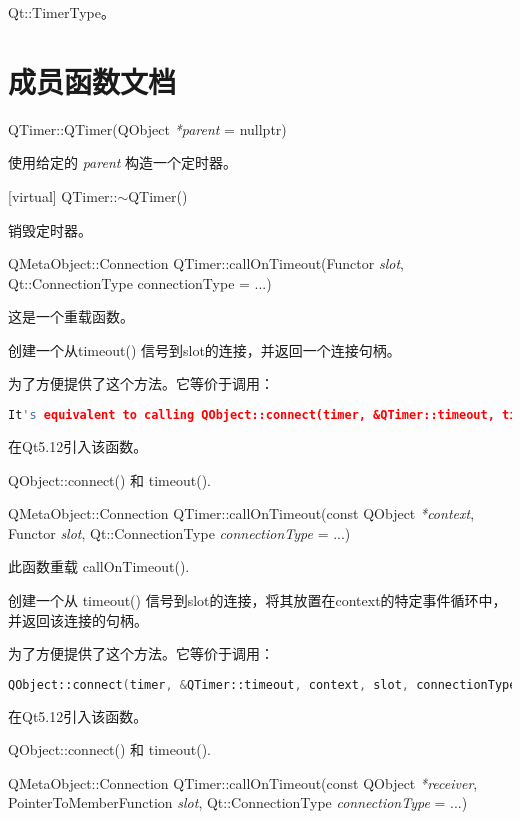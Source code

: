 \begin{seeAlso}
Qt::TimerType。
\end{seeAlso}

\section{成员函数文档}

QTimer::QTimer(QObject \emph{*parent} = nullptr)

使用给定的 \emph{parent} 构造一个定时器。

[virtual] QTimer::$\sim$QTimer()

销毁定时器。

QMetaObject::Connection QTimer::callOnTimeout(Functor \emph{slot}, Qt::ConnectionType connectionType = ...)

这是一个重载函数。

创建一个从timeout() 信号到slot的连接，并返回一个连接句柄。

为了方便提供了这个方法。它等价于调用：

\begin{lstlisting}[language=C++]
It's equivalent to calling QObject::connect(timer, &QTimer::timeout, timer, slot, connectionType).
\end{lstlisting}

在Qt5.12引入该函数。

\begin{seeAlso}
QObject::connect() 和 timeout().
\end{seeAlso}

QMetaObject::Connection QTimer::callOnTimeout(const QObject \emph{*context}, Functor \emph{slot}, Qt::ConnectionType \emph{connectionType} = ...)

此函数重载 callOnTimeout().

创建一个从 timeout() 信号到slot的连接，将其放置在context的特定事件循环中，并返回该连接的句柄。

为了方便提供了这个方法。它等价于调用：


\begin{lstlisting}[language=C++]
QObject::connect(timer, &QTimer::timeout, context, slot, connectionType).
\end{lstlisting}
	
在Qt5.12引入该函数。
	
\begin{seeAlso}
QObject::connect() 和 timeout().
\end{seeAlso}

QMetaObject::Connection QTimer::callOnTimeout(const QObject \emph{*receiver}, PointerToMemberFunction \emph{slot}, Qt::ConnectionType \emph{connectionType} = ...)

